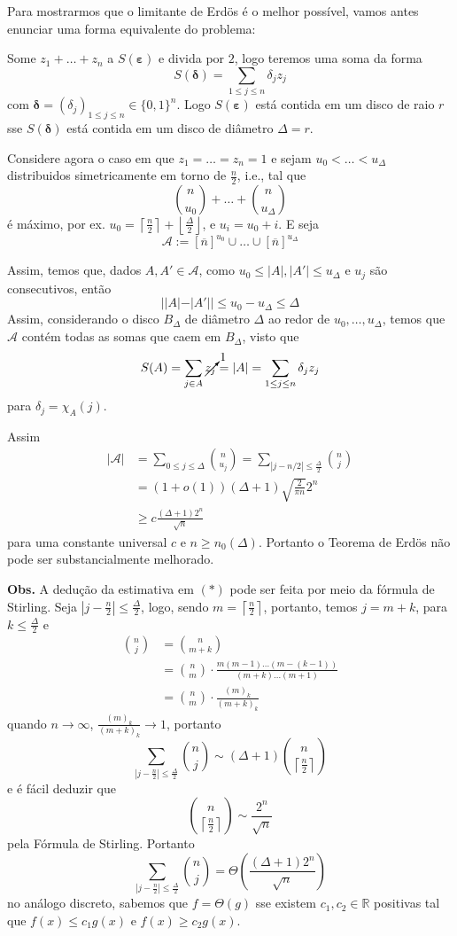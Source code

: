 \documentclass[11pt]{article}
\newcommand{\mbb}[1]{\mathbb{#1}}
\newcommand{\ol}[1]{\overline{#1}}
\newcommand{\rp}[1]{{\left(#1\right)}}
\newcommand\floor[1]{{\left\lfloor#1\right\rfloor}}
\newcommand\ceil[1]{{\left\lceil#1\right\rceil}}
\newcommand{\cl}[1]{\colorlet{shadecolor}{#1}}
\begin{document}
Para mostrarmos que o limitante de Erdös é o melhor possível, vamos antes enunciar uma forma equivalente do problema:

Some $z_1+\dots+z_n$ a $S(\boldsymbol{\varepsilon})$ e divida por $2$, logo teremos uma soma da forma
$$S(\boldsymbol{\delta})=\sum_{1\leq j\leq n}\delta_jz_j$$
com $\boldsymbol{\delta}=(\delta_j)_{1\leq j\leq n}\in\{0,1\}^n$. Logo $S(\boldsymbol{\varepsilon})$ está contida em um disco de raio $r$ sse $S(\boldsymbol{\delta})$ está contida em um disco de diâmetro $\Delta=r$.

Considere agora o caso em que $z_1=\dots=z_n=1$ e sejam $u_0<\dots<u_\Delta$ distribuidos simetricamente em torno de $\frac{n}{2}$, i.e., tal que
$$\binom{n}{u_0}+\dots+\binom{n}{u_\Delta}$$
é máximo, por ex. $u_0=\ceil{\frac{n}{2}}+\floor{\frac{\Delta}{2}}$, e $u_i=u_0+i$. E seja
$$\mathscr{A}:=[\ol{n}]^{u_0}\cup\dots\cup[\ol{n}]^{u_\Delta}$$

Assim, temos que, dados $A,A'\in\mathscr{A}$, como $u_0\leq|A|,|A'|\leq u_\Delta$ e $u_j$ são consecutivos, então
$$||A| - |A'|| \leq u_0 - u_\Delta \leq \Delta$$
Assim, considerando o disco $B_\Delta$ de diâmetro $\Delta$ ao redor de $u_0,\dots,u_\Delta$, temos que $\mathscr{A}$ contém todas as somas que caem em $B_\Delta$, visto que
$$S(A)=\sum_{j\in A}\cancelto{1}{z_j}=|A|=\sum_{1\leq j\leq n}\delta_jz_j$$
para $\delta_j=\chi_A(j)$.

Assim
\begin{align*}
    |\mathscr{A}| & = \sum_{0\leq j\leq\Delta}\binom{n}{u_j} = \sum_{|j-n/2|\leq\frac{\Delta}{2}}\binom{n}{j}\\
    & = (1 + o(1))(\Delta+1)\sqrt{\frac{2}{\pi n}}2^n\tag{$*$}\\
    & \geq c\frac{(\Delta+1)2^n}{\sqrt{n}}
\end{align*}
para uma constante universal $c$ e $n\geq n_0(\Delta)$. Portanto o Teorema de Erdös não pode ser substancialmente melhorado.

\cl{purple!15}
\begin{shaded}
\textbf{Obs.} A dedução da estimativa em $(*)$ pode ser feita por meio da fórmula de Stirling. Seja $|j-\frac{n}{2}|\leq\frac{\Delta}{2}$, logo, sendo $m=\ceil{\frac{n}{2}}$, portanto, temos $j=m+k$, para $k\leq\frac{\Delta}{2}$ e
\begin{align*}
    \binom{n}{j} & = \binom{n}{m+k}\\
    & = \binom{n}{m}\cdot\frac{m(m-1)\dots(m-(k-1))}{(m+k)\dots(m+1)}\\
    & = \binom{n}{m}\cdot\frac{(m)_k}{(m+k)_k}
\end{align*}
quando $n\to\infty$, $\frac{(m)_k}{(m+k)_k}\to 1$, portanto
$$\sum_{|j-\frac{n}{2}|\leq\frac{\Delta}{2}}\binom{n}{j}\sim(\Delta+1)\binom{n}{\ceil{\frac{n}{2}}}$$
e é fácil deduzir que
$$\binom{n}{\ceil{\frac{n}{2}}}\sim\frac{2^n}{\sqrt{n}}$$
pela Fórmula de Stirling. Portanto
$$\sum_{|j-\frac{n}{2}|\leq\frac{\Delta}{2}}\binom{n}{j}=\Theta\rp{\frac{(\Delta+1)2^n}{\sqrt{n}}}$$
no análogo discreto, sabemos que $f=\Theta(g)$ sse existem $c_1,c_2\in\mbb{R}$ positivas tal que $f(x)\leq c_1g(x)$ e $f(x)\geq c_2g(x)$.
\end{shaded}
\end{document}
